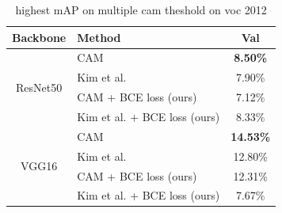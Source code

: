 \documentclass[conference]{IEEEtran}
\begin{document}
\begin{table}[t]
    \centering
    \caption{highest mAP on multiple cam theshold on voc 2012}
    \label{tab:brute_force_cam_threshold_map_voc_2012}
    \begin{tabular}{|c|l|c|}
        \hline
        Backbone                     & Method                                              & Val                             \\
        \hline
        \multirow[c]{4}{*}{ResNet50} & CAM\cite{zhou2015cnnlocalization}                   & \color{red} \bfseries{8.50\%}   \\
                                     & Kim et al. \cite{kim2022bridging}                   & 7.90\%                          \\
                                     & CAM\cite{zhou2015cnnlocalization} + BCE loss (ours) & 7.12\%                          \\
                                     & Kim et al. \cite{kim2022bridging} + BCE loss (ours) & 8.33\%                          \\
        \hline
        \multirow[c]{4}{*}{VGG16}    & CAM\cite{zhou2015cnnlocalization}                   & \color{blue} \bfseries{14.53\%} \\
                                     & Kim et al. \cite{kim2022bridging}                   & 12.80\%                         \\
                                     & CAM\cite{zhou2015cnnlocalization} + BCE loss (ours) & 12.31\%                         \\
                                     & Kim et al. \cite{kim2022bridging} + BCE loss (ours) & 7.67\%                          \\
        \hline
    \end{tabular}
\end{table}
\end{document}
